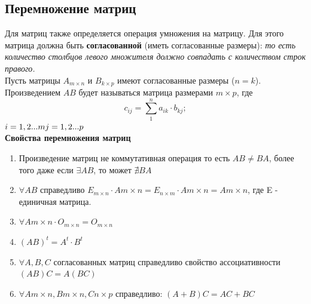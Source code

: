 \documentclass[oneside]{book}
\begin{document}
\begin{enumerate}
\begin{itemize}
\begin{enumerate}
\subsection{Перемножение матриц}
Для матриц также определяется операция умножения на матрицу. Для этого матрица должна быть \textbf{согласованной} (иметь согласованные размеры): \textit{то есть количество столбцов левого множителя должно совпадать с количеством строк правого.}\\
Пусть матрицы 	$A_{m\times n}$	и $B_{k\times p}$ имеют согласованные размеры ($n=k$). Произведением $AB$ будет называться матрица размерами $m\times p$, где 
$$c_{i j}=\sum_{1}^{n} a_{i k}\cdot b_{k j};$$ $i= 1, 2... m\\ j= 1, 2... p$\\
\textbf{Свойства перемножения матриц}
\begin{enumerate}
\item  Произведение матриц не коммутативная операция то есть $AB\ne BA$, более того даже если $\exists AB$, то может $\nexists BA$	
\item $\forall AB$ справедливо $E_{m\times n}\cdot A{m\times n}=E_{n\times m}\cdot A{m\times n}=A{m\times n}$, где E - единичная матрица.
\item $\forall A{m\times n}\cdot O_{m\times n} = O_{m\times n} $
\item $(AB)^{t}=A^{t}\cdot B^{t}$
\item $\forall A, B, C$ согласованных матриц справедливо свойство ассоциативности $(AB)C=A(BC)$ 
\item $\forall A{m\times n}, B{m\times n}, C{n\times p}$ справедливо: $(A+B)C=AC+BC$
\end{enumerate}


\end{enumerate}
\end{itemize}
\end{enumerate}
\end{document}
